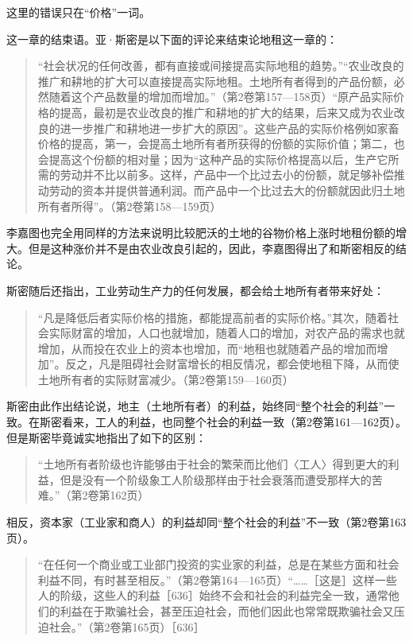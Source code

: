 这里的错误只在“价格”一词。


这一章的结束语。亚·斯密是以下面的评论来结束论地租这一章的：

\begin{quote}{“社会状况的任何改善，都有直接或间接提高实际地租的趋势。”“农业改良的推广和耕地的扩大可以直接提高实际地租。土地所有者得到的产品份额，必然随着这个产品数量的增加而增加。”（第2卷第157—158页）“原产品实际价格的提高，最初是农业改良的推广和耕地的扩大的结果，后来又成为农业改良的进一步推广和耕地进一步扩大的原因”。这些产品的实际价格例如家畜价格的提高，第一，会提高土地所有者所获得的份额的实际价值；第二，也会提高这个份额的相对量；因为“这种产品的实际价格提高以后，生产它所需的劳动并不比以前多。这样，产品中一个比过去小的份额，就足够补偿推动劳动的资本并提供普通利润。而产品中一个比过去大的份额就因此归土地所有者所得”。（第2卷第158—159页）}\end{quote}

李嘉图也完全用同样的方法来说明比较肥沃的土地的谷物价格上涨时地租份额的增大。但是这种涨价并不是由农业改良引起的，因此，李嘉图得出了和斯密相反的结论。

斯密随后还指出，工业劳动生产力的任何发展，都会给土地所有者带来好处：

\begin{quote}{“凡是降低后者实际价格的措施，都能提高前者的实际价格。”其次，随着社会实际财富的增加，人口也就增加，随着人口的增加，对农产品的需求也就增加，从而投在农业上的资本也增加，而“地租也就随着产品的增加而增加”。反之，凡是阻碍社会财富增长的相反情况，都会使地租下降，从而使土地所有者的实际财富减少。（第2卷第159—160页）}\end{quote}

斯密由此作出结论说，地主（土地所有者）的利益，始终同“整个社会的利益”一致。在斯密看来，工人的利益，也同整个社会的利益一致（第2卷第161—162页）。但是斯密毕竟诚实地指出了如下的区别：

\begin{quote}{“土地所有者阶级也许能够由于社会的繁荣而比他们〈工人〉得到更大的利益，但是没有一个阶级象工人阶级那样由于社会衰落而遭受那样大的苦难。”（第2卷第162页）}\end{quote}

相反，资本家（工业家和商人）的利益却同“整个社会的利益”不一致（第2卷第163页）。

\begin{quote}{“在任何一个商业或工业部门投资的实业家的利益，总是在某些方面和社会利益不同，有时甚至相反。”（第2卷第164—165页）“……［这是］这样一些人的阶级，这些人的利益［636］始终不会和社会的利益完全一致，通常他们的利益在于欺骗社会，甚至压迫社会，而他们因此也常常既欺骗社会又压迫社会。”（第2卷第165页）［636］}\end{quote}


